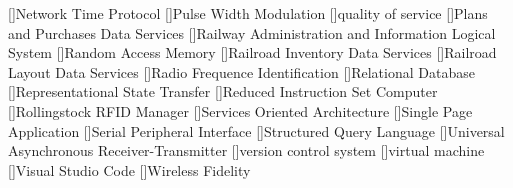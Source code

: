 []{Network Time Protocol}
[]{Pulse Width Modulation}
[]{quality of service}
[]{Plans and Purchases Data Services}
[]{Railway Administration and Information Logical System}
[]{Random Access Memory}
[]{Railroad Inventory Data Services}
[]{Railroad Layout Data Services}
[]{Radio Frequence Identification}
[]{Relational Database}
[]{Representational State Transfer}
[]{Reduced Instruction Set Computer}
[]{Rollingstock RFID Manager}
[]{Services Oriented Architecture}
[]{Single Page Application}
[]{Serial Peripheral Interface}
[]{Structured Query Language}
[]{Universal Asynchronous Receiver-Transmitter}
[]{version control system}
[]{virtual machine}
[]{Visual Studio Code}
[]{Wireless Fidelity}
